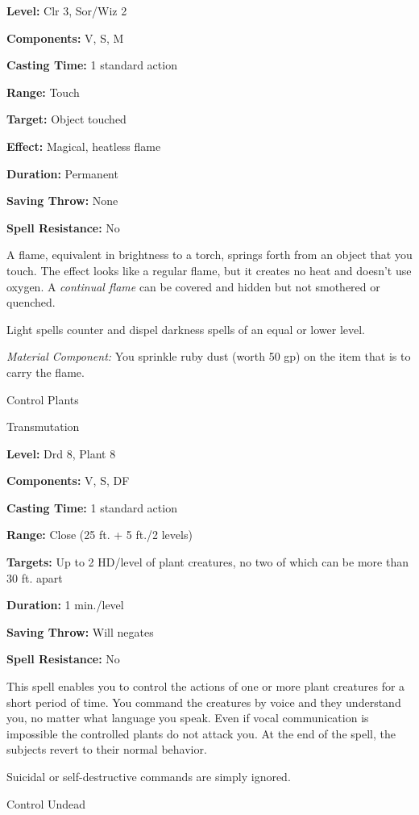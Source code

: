 \documentclass{article}
\begin{document}
\textbf{Level:} Clr 3, Sor/Wiz 2

\textbf{Components:} V, S, M

\textbf{Casting Time:} 1 standard action

\textbf{Range:} Touch

\textbf{Target:} Object touched

\textbf{Effect: }Magical, heatless flame

\textbf{Duration:} Permanent

\textbf{Saving Throw:} None

\textbf{Spell Resistance:} No

A flame, equivalent in brightness to a torch, springs forth from an object that 
you touch. The effect looks like a regular flame, but it creates no heat and doesn't 
use oxygen. A \textit{continual flame }can be covered and hidden but not smothered 
or quenched.

Light spells counter and dispel darkness spells of an equal or lower level.

\textit{Material Component: }You sprinkle ruby dust (worth 50 gp) on the item that 
is to carry the flame.

\vspace{12pt}
Control Plants

Transmutation

\textbf{Level:} Drd 8, Plant 8

\textbf{Components:} V, S, DF

\textbf{Casting Time:} 1 standard action

\textbf{Range:} Close (25 ft. + 5 ft./2 levels)

\textbf{Targets:} Up to 2 HD/level of plant creatures, no two of which can be more 
than 30 ft. apart

\textbf{Duration:} 1 min./level

\textbf{Saving Throw: }Will negates

\textbf{Spell Resistance:} No

This spell enables you to control the actions of one or more plant creatures for 
a short period of time. You command the creatures by voice and they understand 
you, no matter what language you speak. Even if vocal communication is impossible 
 the controlled plants do not attack you. At the end of the spell, the subjects 
revert to their normal behavior.

Suicidal or self-destructive commands are simply ignored.

\vspace{12pt}
Control Undead
\end{document}
